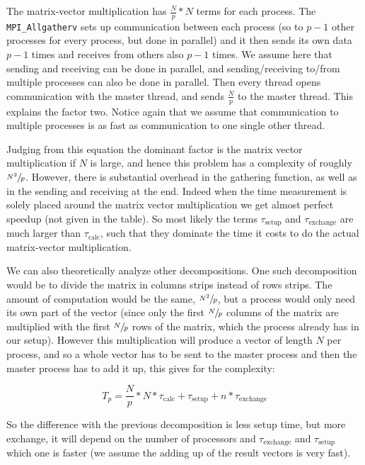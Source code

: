 \documentclass[11pt,a4paper,onecolumn]{article}
\begin{document}
The matrix-vector multiplication has $\frac{N}{p}*N$ terms for each process. The \texttt{MPI\_Allgatherv} sets up communication between each process (so to $p-1$ other processes for every process, but done in parallel) and it then sends its own data $p-1$ times and receives from others also $p-1$ times. We assume here that sending and receiving can be done in parallel, and sending/receiving to/from multiple processes can also be done in parallel. Then every thread opens communication with the master thread, and sends $\frac{N}{p}$ to the master thread. This explains the factor two. Notice again that we assume that communication to multiple processes is as fast as communication to one single other thread.

Judging from this equation the dominant factor is the matrix vector multiplication if $N$ is large, and hence this problem has a complexity of roughly $\sfrac{N^2}{p}$. However, there is substantial overhead in the gathering function, as well as in the sending and receiving at the end. Indeed when the time measurement is solely placed around the matrix vector multiplication we get almost perfect speedup (not given in the table). So most likely the terms $\tau_{\text{setup}}$ and $\tau_{\text{exchange}}$ are much larger than $\tau_{\text{calc}}$, such that they dominate the time it costs to do the actual matrix-vector multiplication.

We can also theoretically analyze other decompositions. One such decomposition would be to divide the matrix in columns strips instead of rows strips. The amount of computation would be the same, $\sfrac{N^2}{p}$, but a process would only need its own part of the vector (since only the first $\sfrac{N}{p}$ columns of the matrix are multiplied with the first $\sfrac{N}{p}$ rows of the matrix, which the process already has in our setup). However this multiplication will produce a vector of length $N$ per process, and so a whole vector has to be sent to the master process and then the master process has to add it up, this gives for the complexity:

\begin{equation}
  T_p = \frac{N}{p} * N * \tau_{\text{calc}} + \tau_{\text{setup}} + n*\tau_{\text{exchange}}
\end{equation}

So the difference with the previous decomposition is less setup time, but more exchange, it will depend on the number of processors and $\tau_{\text{exchange}}$ and $\tau_{\text{setup}}$ which one is faster (we assume the adding up of the result vectors is very fast).
\end{document}
